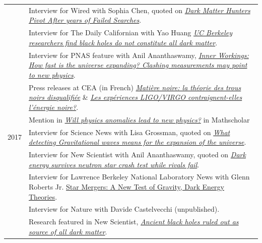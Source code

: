 \documentclass[11pt,a4paper]{article}
\begin{document}
\begin{longtable}{c p{15cm}}
\\[2pt]
& {Interview for Wired} with Sophia Chen, quoted on \href{https://www.wired.com/story/for-dark-matter-hunters-out-there-theories-are-catching-on/}{\textit{Dark Matter Hunters Pivot After years of Failed Searches}}.
\\[2pt]
& {Interview for The Daily Californian} with Yao Huang \href{http://www.dailycal.org/2018/10/03/uc-berkeley-researchers-find-black-holes-do-not-constitute-all-dark-matter/}{\textit{UC Berkeley researchers find black holes do not constitute all dark matter}}.
\\[2pt]
& {Interview for PNAS feature} with Anil Ananthaswamy, \href{http://www.pnas.org/content/115/40/9810.full}{\textit{
Inner Workings: How fast is the universe expanding? Clashing measurements may point to new physics}}.
\\[2pt]
& {Press releases at CEA} (in French) \href{http://www.cea.fr/drf/Pages/Actualites/En-direct-des-labos/2018/matiere-noire--la-theorie-des-trous-noirs-disqualifiee-.aspx}{\textit{Mati\`ere noire: la th\'eorie des trous noirs disqualifi\'ee}} \& \href{https://www.ipht.fr/Phocea/Vie_des_labos/News/index.php?id_news=860}{\textit{Les exp\'eriences LIGO/VIRGO contraignent-elles l'\'energie noire?}}.
\\[2pt]
& Mention in \href{https://mathscholar.org/2018/04/will-physics-anomalies-lead-to-new-physics/}{\it Will physics anomalies lead to new physics?} in Mathscholar
\\[2pt]
2017 
& {Interview for Science News} with Lisa Grossman, quoted on \href{https://www.sciencenews.org/article/what-detecting-gravitational-waves-means-expansion-universe}{\textit{What detecting Gravitational waves means for the expansion of the universe}}.
\\[2pt]
& {Interview for New Scientist} with Anil Ananthaswamy, quoted on \href{https://www.newscientist.com/article/2151020-dark-energy-survives-neutron-star-crash-test-while-rivals-fail/}{\textit{Dark energy survives neutron star crash test while rivals fail}}.
\\[2pt]
& {Interview for Lawrence Berkeley National Laboratory News} with Glenn Roberts Jr. \href{http://newscenter.lbl.gov/2017/12/18/star-mergers-test-gravity-dark-energy-theories/}{Star Mergers: A New Test of Gravity, Dark Energy Theories}.
\\[2pt]
& {Interview for Nature} with Davide Castelvecchi (unpublished). %
\\[2pt]
& {Research featured in New Scientist}, \href{https://www.newscientist.com/article/2156252-ancient-black-holes-ruled-out-as-source-of-all-dark-matter}{\textit{Ancient black holes ruled out as source of all dark matter}}.

\end{longtable}
\end{document}
